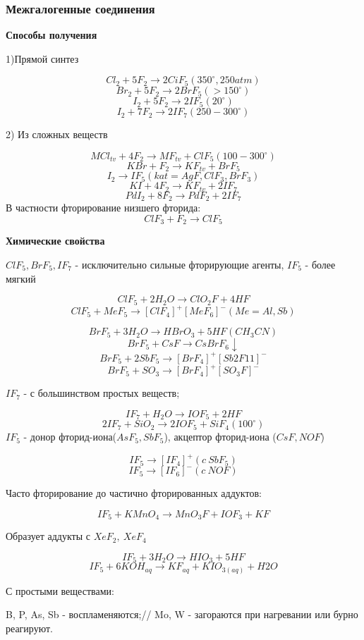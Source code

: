 \documentclass[14pt,a4paper]{scrartcl}
\begin{document}
\subsubsection{Межгалогенные соединения}

\textbf{Способы получения}

1)Прямой синтез

$$Cl_2 + 5F_2 \rightarrow 2CiF_5 (350^{\circ}, 250 atm)$$
$$Br_2 + 5F_2 \rightarrow 2BrF_5 (>150^{\circ})$$
$$I_2 + 5F_2 \rightarrow 2IF_5 (20^{\circ})$$
$$I_2 + 7F_2 \rightarrow 2IF_7 (250-300^{\circ})$$

2) Из сложных веществ

$$MCl_{tv} + 4F_2 \rightarrow MF_{tv} + ClF_5(100-300^{\circ})$$
$$KBr + F_2 \rightarrow KF_{tv} + BrF_5$$
$$I_2 \rightarrow IF_5 (kat=AgF,ClF_3, BrF_3)$$
$$KI + 4F_2 \rightarrow KF_{tv} + 2IF_7$$
$$PdI_2 + 8F_2 \rightarrow PdF_2 + 2IF_7$$
В частности фторирование низшего фторида:
$$ClF_3 + F_2 \rightarrow ClF_5$$

\textbf{Химические свойства}

$ClF_5, BrF_5, IF_7$ - исключительно сильные фторирующие агенты, $IF_5$ - более мягкий

$$ClF_5 + 2H_2O \rightarrow ClO_2F + 4HF$$
$$ClF_5 + MeF_5 \rightarrow [ClF_4]^+[MeF_6]^-(Me= Al,Sb)$$

$$BrF_5 + 3H_2O \rightarrow HBrO_3 + 5HF (CH_3CN)$$
$$BrF_5 + CsF \rightarrow CsBrF_6\downarrow$$
$$BrF_5 + 2SbF_5 \rightarrow[BrF_4]^+[Sb2F11]^-$$
$$BrF_5 + SO_3 \rightarrow [BrF_4]^+[SO_3F]^-$$

$IF_7$ - с большинством простых веществ;

$$IF_7 + H_2O \rightarrow IOF_5 + 2HF$$
$$2IF_7 + SiO_2 \rightarrow 2IOF_5 + SiF_4 (100^{\circ})$$
$IF_5$ - донор фторид-иона($AsF_5,SbF_5$), акцептор фторид-иона ($CsF, NOF$)

$$IF_5 \rightarrow [IF_4]^+(c\ SbF_5)$$
$$IF_5 \rightarrow [IF_6]^-(c\ NOF)$$

Часто фторирование до частично фторированных аддуктов:

$$IF_5 + KMnO_4 \rightarrow MnO_3F + IOF_3 + KF$$

Образует аддукты с $XeF_2,\ XeF_4$

$$IF_5 + 3H_2O \rightarrow HIO_3 + 5HF$$
$$IF_5 + 6KOH_{aq}\rightarrow KF_{aq}+ KIO_{3(aq)} + H2O$$

С простыми веществами:

B, P, As, Sb - воспламеняются;//
Mo, W - загораются при нагревании или бурно реагируют.
\end{document}
